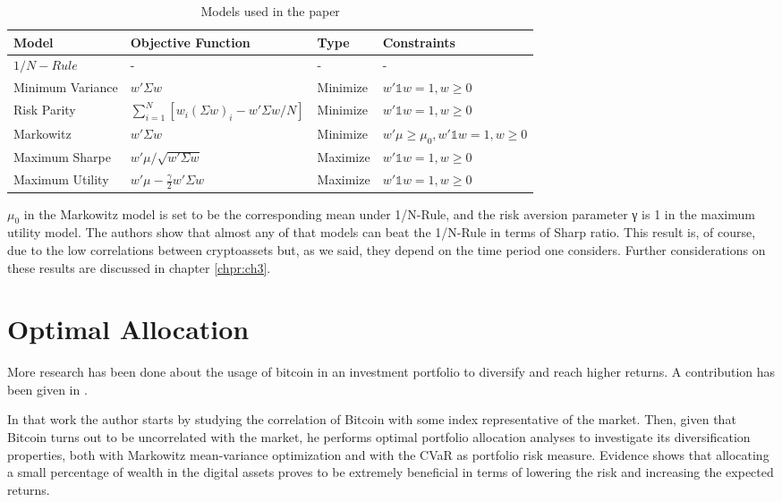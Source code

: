 \begin{table}[H]
    \begin{tabular}{p{2.5cm}|p{4.4cm}|p{1.9cm}|p{3cm}}
    Model & Objective Function & Type & Constraints \\
    \hline
    \(\displaystyle 1/N -  Rule\) & - & - & - \\ \hline
    Minimum Variance & \(\displaystyle w'\Sigma w\) & Minimize & \(\displaystyle w'\mathbb{1} w=1, w \geq 0 \) \\ \hline
    Risk Parity & \(\displaystyle \sum_{{i=1}}^{N} \left[w_i \left(\Sigma w\right)_i-w'\Sigma w/N\right] \) & Minimize & \(\displaystyle w'\mathbb{1} w=1, w\geq 0 \) \\ \hline
    Markowitz & \(\displaystyle w'\Sigma w \) & Minimize & \(\displaystyle w'\mu\geq\mu_0, w'\mathbb{1} w=1, w\geq 0 \) \\ \hline
    Maximum Sharpe & \(\displaystyle w'\mu /\sqrt{w'\Sigma w} \) & Maximize & \(\displaystyle w'\mathbb{1} w=1, w\geq 0 \) \\   \hline
    Maximum Utility & \(\displaystyle w'\mu - \frac{\gamma}{2}w'\Sigma w \) & Maximize & \(\displaystyle w'\mathbb{1} w=1, w\geq 0 \) \\
    \hline
    \end{tabular}
    \caption{Models used  in the paper}
    \label{tab_21}
\end{table}

\bigskip
$\mu_0$ in the Markowitz model is set to be the corresponding mean under 1/N-Rule, and the risk aversion parameter γ is 1 in the maximum utility model.
The authors show that almost any of that models can beat the 1/N-Rule in terms of Sharp ratio.
This result is, of course, due to the low correlations between cryptoassets but, as we said, they depend on the time period one considers. Further considerations on these results are discussed in chapter \ref{chpr:ch3}.

\section{Optimal Allocation}
More research has been done about the usage of bitcoin in an investment portfolio to diversify and reach higher returns. A contribution has been given in \citep{samuele}.

In that work the author starts by studying the correlation of Bitcoin with some index representative of the market. Then, given that Bitcoin turns out to be uncorrelated with the market, he performs optimal portfolio allocation analyses to investigate its diversification properties, both with Markowitz mean-variance optimization and with the CVaR as portfolio risk measure. Evidence shows that allocating a small percentage of wealth in the digital assets proves to be extremely beneficial in terms of lowering the risk and increasing the expected returns.

